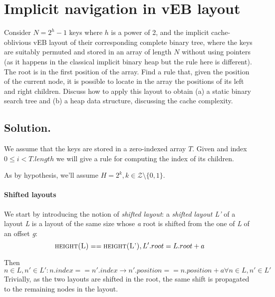 \section{Implicit navigation in vEB layout}
Consider $N = 2^h - 1$ keys where $h$ is a power of 2, and the implicit cache-oblivious vEB layout of their corresponding complete binary tree, where the keys are suitably permuted and stored in an array of length $N$ without using pointers (as it happens in the classical implicit binary heap but the rule here is different). The root is in the first position of the array. Find a rule that, given the position of the current node, it is possible to locate in the array the positions of its left and right children. Discuss how to apply this layout to obtain (a) a static binary search tree and (b) a heap data structure, discussing the cache complexity.

\vspace{0.5cm}
\subsection{Solution.} We assume that the keys are stored in a zero-indexed array $T$. Given and index $0 \leq i < T.length$ we will give a rule for computing the index of its children.

\begin{center}
\end{center}

As  by hypothesis, we'll assume $H = 2^k, k \in \mathcal{Z} \setminus \{0, 1\} $.
\label{15_shift_layouts}~\paragraph{Shifted layouts} We start by introducing the notion of \emph{shifted layout}: a \emph{shifted layout L'} of a layout \emph{L} is a layout of the same size whose \emph{a} root is shifted from the one of \emph{L} of an offset \emph{g}:
	\begin{equation}
	\textsc{height(L)} == \textsc{height(L')}, L'.root = L.root + a
	\end{equation}

Then
	\begin{equation}
	n \in L, n' \in L': n.index == n'.index \to n'.position == n.position + a \forall n \in L, n' \in L'
	\end{equation}
Trivially, as the two layouts are shifted in the root, the same shift is propagated to the remaining nodes in the layout.

